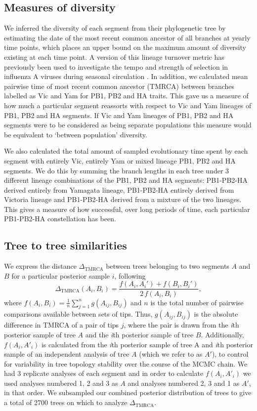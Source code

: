 \documentclass[11pt,oneside,letterpaper]{article}
\newcommand{\dtmrca}{\Delta_\mathrm{TMRCA}}
\begin{document}
\subsection*{Measures of diversity}
We inferred the diversity of each segment from their phylogenetic tree by estimating the date of the most recent common ancestor of all branches at yearly time points, which places an upper bound on the maximum amount of diversity existing at each time point.
A version of this lineage turnover metric has previously been used to investigate the tempo and strength of selection in influenza A viruses during seasonal circulation \citep{bedford2011}.
In addition, we calculated mean pairwise time of most recent common ancestor (TMRCA) between branches labelled as Vic and Yam for PB1, PB2 and HA traits.
This gave us a measure of how much a particular segment reassorts with respect to Vic and Yam lineages of PB1, PB2 and HA segments.
If Vic and Yam lineages of PB1, PB2 and HA segments were to be considered as being separate populations this measure would be equivalent to `between population' diversity.

We also calculated the total amount of sampled evolutionary time spent by each segment with entirely Vic, entirely Yam or mixed lineage PB1, PB2 and HA segments.
We do this by summing the branch lengths in each tree under 3 different lineage combinations of the PB1, PB2 and HA segments: PB1-PB2-HA derived entirely from Yamagata lineage, PB1-PB2-HA entirely derived from Victoria lineage and PB1-PB2-HA derived from a mixture of the two lineages.
This gives a measure of how successful, over long periods of time, each particular PB1-PB2-HA constellation has been.

\subsection*{Tree to tree similarities}
We express the distance $\dtmrca$ between trees belonging to two segments $A$ and $B$ for a particular posterior sample $i$, following
\begin{equation}
\dtmrca(A_i, B_i) = \frac{f(A_i, A_i') + f(B_i, B_i')}{2 \, f(A_i, B_i)},
\end{equation}
where $f(A_i, B_i) = \frac{1}{n}\sum_{j=1}^n g(A_{ij}, B_{ij})$ and $n$ is the total number of pairwise comparisons available between sets of tips.
Thus, $g(A_{ij},B_{ij})$ is the absolute difference in TMRCA of a pair of tips $j$, where the pair is drawn from the \textit{i}th posterior sample of tree $A$ and the \textit{i}th posterior sample of tree $B$.
Additionally, $f(A_i,A'_i)$ is calculated from the \textit{i}th posterior sample of tree A and \textit{i}th posterior sample of an independent analysis of tree $A$ (which we refer to as $A'$), to control for variability in tree topology stability over the course of the MCMC chain.
We had 3 replicate analyses of each segment and in order to calculate $f(A_i,A'_i)$ we used analyses numbered 1, 2 and 3 as $A$ and analyses numbered 2, 3 and 1 as $A'$, in that order.
We subsampled our combined posterior distribution of trees to give a total of 2700 trees on which to analyze $\dtmrca$.
\end{document}

